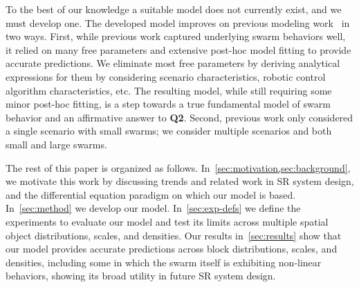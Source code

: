 To the best of our knowledge a suitable model does not currently exist, and we
must develop one. The developed model improves on previous modeling
work~\cite{Lerman2002,Lerman2001,Lerman2003a} in two ways. First, while previous
work captured underlying swarm behaviors well, it relied on many free parameters
and extensive post-hoc model fitting to provide accurate predictions. We
eliminate most free parameters by deriving analytical expressions for them by
considering scenario characteristics, robotic control algorithm characteristics,
etc. The resulting model, while still requiring some minor post-hoc fitting, is
a step towards a true fundamental model of swarm behavior and an affirmative
answer to \textbf{Q2}. Second, previous work only considered a single scenario
with small swarms; we consider multiple scenarios and both small and large
swarms.

The rest of this paper is organized as
follows. In~\cref{sec:motivation,sec:background}, we motivate this work by
discussing trends and related work in SR system design, and the differential
equation paradigm on which our model is based. In~\cref{sec:method} we develop
our model. In~\cref{sec:exp-defs} we define the experiments to evaluate our
model and test its limits across multiple spatial object distributions, scales,
and densities. Our results in~\cref{sec:results} show that our model provides
accurate predictions across block distributions, scales, and densities,
including some in which the swarm itself is exhibiting non-linear behaviors,
showing its broad utility in future SR system design.

